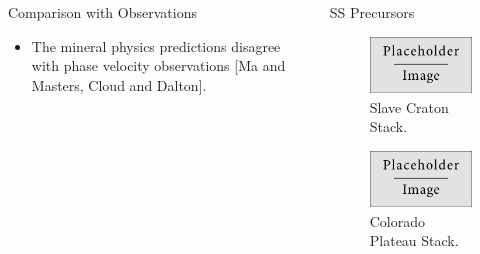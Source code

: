 \documentclass[final]{beamer}
\newlength{\onecolwid}
\newlength{\twocolwid}
\begin{document}
\begin{frame}[t]
\begin{columns}[t]
\begin{column}{\twocolwid}
\begin{columns}[t,totalwidth=\twocolwid]
\begin{column}{\onecolwid}
\begin{alertblock}{Comparison with Observations}
\begin{itemize}
\item The mineral physics predictions disagree with phase velocity observations [Ma and Masters, Cloud and Dalton].

\end{itemize}

\end{alertblock}


\end{column} %

\begin{column}{\onecolwid} %


\begin{block}{SS Precursors}

\begin{figure}
\includegraphics{img/placeholder.jpg}
\caption{Slave Craton Stack.}
\end{figure}

\begin{figure}
\includegraphics{img/placeholder.jpg}
\caption{Colorado Plateau Stack.}
\end{figure}



\end{block}
\end{column}
\end{columns}
\end{column}
\end{columns}
\end{frame}
\end{document}
